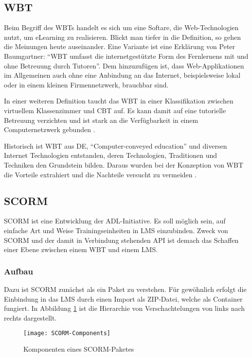 \subsection{WBT}
Beim Begriff des WBTs handelt es sich um eine Softare, die Web-Technologien
nutzt, um eLearning zu realisieren. Blickt man tiefer in die Definition, so
gehen die Meinungen heute auseinander. Eine Variante ist eine Erklärung von
Peter Baumgartner: "`WBT umfasst die internetgestützte Form des Fernlernens mit
und ohne Betreuung durch Tutoren"'\cite{baumgartner:2002}. Dem hinzuzufügen ist,
dass Web-Applikationen im Allgemeinen auch ohne eine Anbindung an das Internet,
beispielsweise lokal oder in einem kleinen Firmennetzwerk, brauchbar sind. 

In einer weiteren Definition taucht das WBT in einer Klassifikation zwischen
virtuellem Klassenzimmer und \ac{CBT} auf. Es kann damit auf eine tutorielle
Betreuung verzichten und ist stark an die Verfügbarkeit in einem
Computernetzwerk gebunden \cite{schleifer:2003}.

Historisch ist WBT aus \ac{DE}, "`Computer-conveyed education"' und diversen
Internet Technologien entstanden, deren Technologien, Traditionen und Techniken
den Grundstein bilden. Daraus wurden bei der Konzeption von WBT die Vorteile
extrahiert und die Nachteile versucht zu vermeiden \cite{horton:2000}.

\subsection{SCORM}\label{ref:scorm}
\ac{SCORM} ist eine Entwicklung der \ac{ADL}-Initiative. Es soll möglich sein,
auf einfache Art und Weise Trainingseinheiten in LMS einzubinden. Zweck von
SCORM und der damit in Verbindung stehenden \ac{API} ist demach das Schaffen einer
Ebene zwischen einem WBT und einem LMS.

\subsubsection{Aufbau}
Dazu ist SCORM zunächst als ein Paket zu verstehen. Für gewöhnlich erfolgt die
Einbindung in das LMS durch einen Import als ZIP-Datei, welche als Container
fungiert. In Abbildung \ref{pic:scormComponents} ist die Hierarchie von
Verschachtelungen von links nach rechts dargestellt.
\begin{figure}[ht]
\centering
\texttt{[image: SCORM-Components]}
\caption{Komponenten eines
SCORM-Paketes\footnotemark}\label{pic:scormComponents}
\end{figure}

